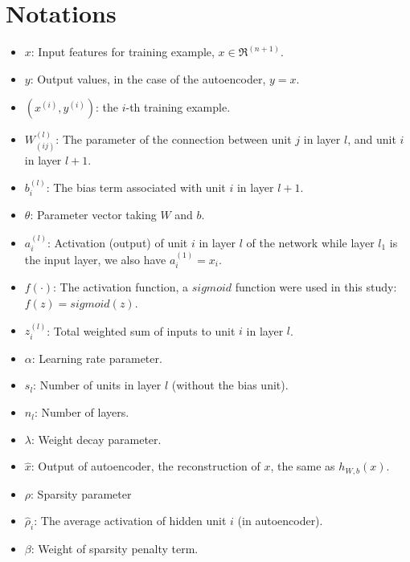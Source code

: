 \documentclass[journal]{IEEEtran}
\begin{document}
%

\appendices
\section{Notations}
\begin{itemize}
\item $x$: Input features for training example, $x \in \Re^{(n+1)}$.
\item $y$: Output values, in the case of the autoencoder, $y=x$.
\item $(x^{(i)},y^{(i)})$: the $i$-th training example.
\item $W_{(ij)}^{(l)}$: The parameter of the connection between unit $j$ in layer $l$, and unit $i$ in layer $l+1$.
\item $b_i^{(l)}$: The bias term associated with unit $i$ in layer $l+1$.
\item $\theta$: Parameter vector taking $W$ and $b$.
\item $a_i^{(l)}$: Activation (output) of unit $i$ in layer $l$ of the network while layer $l_1$ is the input layer, we also have $a^{(1)}_i = x_i$.
\item $f(\cdot)$: The activation function, a $sigmoid$ function were used in this study: $f(z) = sigmoid(z)$.
\item $z_i^{(l)}$: Total weighted sum of inputs to unit $i$ in layer $l$.
\item $\alpha$: Learning rate parameter.
\item $s_l$: Number of units in layer $l$ (without the bias unit).
\item $n_l$: Number of layers.
\item $\lambda$: Weight decay parameter.
\item $\hat{x}$: Output of autoencoder, the reconstruction of $x$, the same as $h_{W,b}(x)$.
\item $\rho$: Sparsity parameter
\item $\hat{\rho}_i$: The average activation of hidden unit $i$ (in autoencoder).
\item $\beta$: Weight of sparsity penalty term.

\end{itemize}
\end{document}
